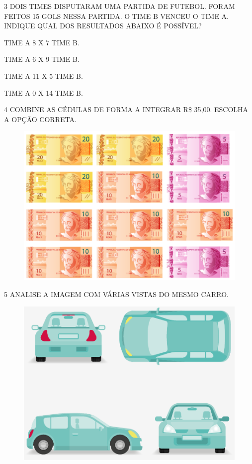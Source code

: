 \num{3} DOIS TIMES DISPUTARAM UMA PARTIDA DE FUTEBOL. FORAM FEITOS 15 GOLS NESSA
PARTIDA. O TIME B VENCEU O TIME A. INDIQUE QUAL DOS RESULTADOS ABAIXO É
POSSÍVEL?

\begin{escolha}[itemsep=0pt]
\item TIME A 8 X 7 TIME B.

\item TIME A 6 X 9 TIME B.

\item TIME A 11 X 5 TIME B.

\item TIME A 0 X 14 TIME B.
\end{escolha}

\pagebreak
\num{4} COMBINE AS CÉDULAS DE FORMA A INTEGRAR R\$ 35,00. ESCOLHA A OPÇÃO CORRETA.

\begin{figure}[htpb!]
\includegraphics[width=.6\textwidth]{./media/SAEB_1ANO_MAT_FIGURA129.png}
\end{figure}

\num{5} ANALISE A IMAGEM COM VÁRIAS VISTAS DO MESMO CARRO.


\begin{figure}[htpb!]
\centering
\includegraphics[width=.5\textwidth]{./media/SAEB_1ANO_MAT_FIGURA130.png}
\end{figure}


